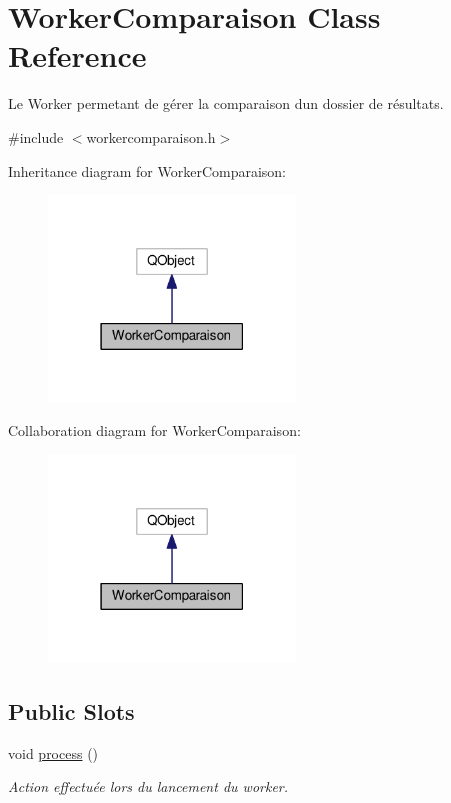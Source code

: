\hypertarget{classWorkerComparaison}{}\section{Worker\+Comparaison Class Reference}
\label{classWorkerComparaison}


Le Worker permetant de gérer la comparaison d\textquotesingle{}un dossier de résultats.  




{\ttfamily \#include $<$workercomparaison.\+h$>$}



Inheritance diagram for Worker\+Comparaison\+:
\nopagebreak
\begin{figure}[H]
\begin{center}
\leavevmode
\includegraphics[width=186pt]{classWorkerComparaison__inherit__graph}
\end{center}
\end{figure}


Collaboration diagram for Worker\+Comparaison\+:
\nopagebreak
\begin{figure}[H]
\begin{center}
\leavevmode
\includegraphics[width=186pt]{classWorkerComparaison__coll__graph}
\end{center}
\end{figure}
\subsection*{Public Slots}
\begin{DoxyCompactItemize}
\item 
void \hyperlink{classWorkerComparaison_ac62afd6b36f0c1590e5f3878334a9928}{process} ()
\begin{DoxyCompactList}\small\item\em Action effectuée lors du lancement du worker. \end{DoxyCompactList}\end{DoxyCompactItemize}

